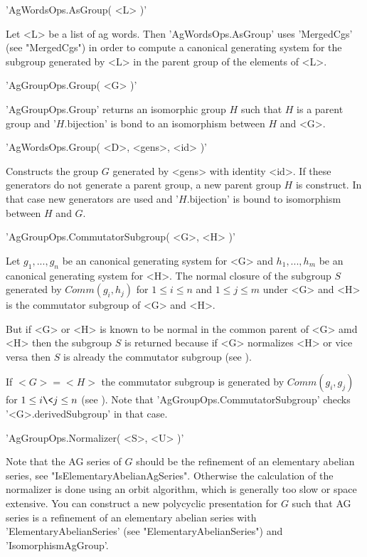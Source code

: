 'AgWordsOps.AsGroup( <L> )'

Let <L> be   a  list of   ag  words.  Then    'AgWordsOps.AsGroup'   uses
'MergedCgs' (see "MergedCgs") in order to compute a  canonical generating
system  for  the subgroup  generated by <L>   in  the parent group of the
elements of <L>.


'AgGroupOps.Group( <G> )'

'AgGroupOps.Group' returns an isomorphic  group  $H$ such  that $H$  is a
parent  group and '$H$.bijection'  is bond to an isomorphism  between $H$
and <G>.

'AgWordsOps.Group( <D>, <gens>, <id> )'

Constructs the group $G$ generated by <gens> with identity <id>. If these
generators do not  generate a  parent group,  a new parent   group $H$ is
construct. In  that case new  generators are used  and '$H$.bijection' is
bound to isomorphism between $H$ and $G$.


'AgGroupOps.CommutatorSubgroup( <G>, <H> )'

Let $g_1, ...,  g_n$ be an canonical generating  system for <G> and $h_1,
...,  h_m$ be an canonical generating  system for <H>. The normal closure
of the subgroup $S$ generated by $Comm( g_i, h_j )$ for $1 \leq i \leq n$
and $1 \leq j \leq m$ under <G> and <H> is the commutator subgroup of <G>
and <H>.

But if <G> or <H> is known to be normal  in the common parent of  <G> amd
<H> then the subgroup $S$ is returned because  if <G>  normalizes  <H> or
vice   versa  then  $S$     is   already  the  commutator subgroup   (see
\cite{Gla87}).

If $<G> = <H>$ the commutator subgroup is generated by $Comm( g_i, g_j )$
for   $1   \leq  i   \<  j  \leq  n$   (see   \cite{LNS84}).   Note  that
'AgGroupOps.CommutatorSubgroup'  checks  '<G>.derivedSubgroup'  in   that
case.


'AgGroupOps.Normalizer( <S>, <U> )'

Note that the AG series of $G$ should be  the refinement of an elementary
abelian  series,   see  "IsElementaryAbelianAgSeries".    Otherwise   the
calculation of the normalizer is done using an orbit  algorithm, which is
generally too  slow or  space extensive.    You    can   construct  a new
polycyclic presentation for $G$ such that AG series is a refinement of an
elementary   abelian    series     with   'ElementaryAbelianSeries'  (see
"ElementaryAbelianSeries") and 'IsomorphismAgGroup'.

